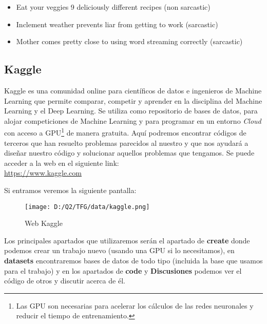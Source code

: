 \documentclass[10pt,riqno,a4paper,twoside]{article}\usepackage[]{graphicx}\usepackage[]{color}
\begin{document}
\begin{itemize}

\item{Eat your veggies 9 deliciously different recipes (non sarcastic)}

\item{Inclement weather prevents liar from getting to work (sarcastic)}

\item{Mother comes pretty close to using word streaming correctly (sarcastic)}

\end{itemize}


\subsection{Kaggle}

Kaggle es una comunidad online para cient\'{i}ficos de datos e ingenieros de Machine Learning que permite comparar, competir y aprender en la disciplina del Machine Learning y el Deep Learning. Se utiliza como repositorio de bases de datos, para alojar competiciones de Machine Learning y para programar en un entorno \textit{Cloud} con acceso a GPU\footnote{Las GPU son necesarias para acelerar los c\'{a}lculos de las redes neuronales y reducir el tiempo de entrenamiento.} de manera gratuita. Aqu\'{i} podremos encontrar c\'{o}digos de terceros que han resuelto problemas parecidos al nuestro y que nos ayudar\'{a} a diseñar nuestro c\'{o}digo y solucionar aquellos problemas que tengamos.  
Se puede acceder a la web en el siguiente link:\\

\href{https://www.kaggle.com}{https://www.kaggle.com}

Si entramos veremos la siguiente pantalla:

\begin{figure}[h]
  \caption{Web Kaggle}
  \begin{center}
\texttt{[image: D:/Q2/TFG/data/kaggle.png]}
\end{center}
\end{figure}


Los principales apartados que utilizaremos ser\'{a}n el apartado de \textbf{create} donde podemos crear un trabajo nuevo (usando una GPU si lo necesitamos), en \textbf{datasets} encontraremos bases de datos de todo tipo (incluida la base que usamos para el trabajo) y en los apartados de \textbf{code} y \textbf{Discusiones} podemos ver el c\'{o}digo de otros y discutir acerca de \'{e}l. 
\end{document}
